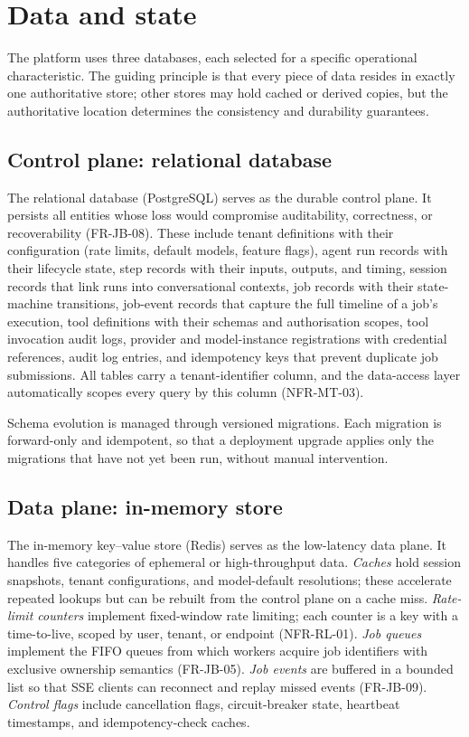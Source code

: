 \documentclass[a4paper,noexaminfo]{sapthesis}
\begin{document}
\section{Data and state}
\label{sec:data-state}

The platform uses three databases, each selected for a specific
operational characteristic.  The guiding principle is that every
piece of data resides in exactly one authoritative store; other stores may
hold cached or derived copies, but the authoritative location determines
the consistency and durability guarantees.

\subsection{Control plane: relational database}

The relational database (PostgreSQL) serves as the durable control plane.
It persists all entities whose loss would compromise auditability,
correctness, or recoverability (FR-JB-08).  These include tenant
definitions with their configuration (rate limits, default models, feature
flags), agent run records with their lifecycle state, step records with
their inputs, outputs, and timing, session records that link runs into
conversational contexts, job records with their state-machine transitions,
job-event records that capture the full timeline of a job's execution,
tool definitions with their schemas and authorisation scopes, tool
invocation audit logs, provider and model-instance registrations with
credential references, audit log entries, and idempotency keys that
prevent duplicate job submissions.  All tables carry a tenant-identifier
column, and the data-access layer automatically scopes every query by
this column (NFR-MT-03).

Schema evolution is managed through versioned migrations.  Each migration
is forward-only and idempotent, so that a deployment upgrade applies only
the migrations that have not yet been run, without manual intervention.

\subsection{Data plane: in-memory store}

The in-memory key--value store (Redis) serves as the low-latency data
plane.  It handles five categories of ephemeral or high-throughput data.
\emph{Caches} hold session snapshots, tenant configurations, and
model-default resolutions; these accelerate repeated lookups but can be
rebuilt from the control plane on a cache miss.  \emph{Rate-limit counters}
implement fixed-window rate limiting; each counter is a key with
a time-to-live, scoped by user, tenant, or endpoint (NFR-RL-01).
\emph{Job queues} implement the FIFO queues from which workers acquire
job identifiers with exclusive ownership semantics (FR-JB-05).  \emph{Job events} are buffered in a bounded list so that
SSE clients can reconnect and replay missed events (FR-JB-09).
\emph{Control flags} include cancellation flags, circuit-breaker state,
heartbeat timestamps, and idempotency-check caches.
\end{document}
